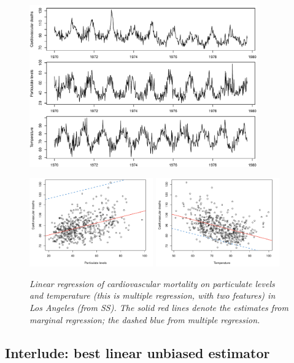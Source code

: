 \documentclass{article}
\begin{document}
\begin{itemize}
\begin{figure}[p]
\centering
\includegraphics[width=0.875\textwidth]{fig/cardio-mult-1.pdf} 

\bigskip\bigskip
\includegraphics[width=0.475\textwidth]{fig/cardio-mult-2.pdf}
\includegraphics[width=0.475\textwidth]{fig/cardio-mult-3.pdf}

\caption{\it Linear regression of cardiovascular mortality on particulate levels
  and temperature (this is multiple regression, with two features) in Los
  Angeles (from SS). The solid red lines denote the estimates from marginal
  regression; the dashed blue from multiple regression.} 
\label{fig:cardio_mult}
\end{figure}
\end{itemize}

\subsection{Interlude: best linear unbiased estimator}
\end{document}
